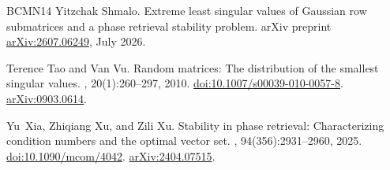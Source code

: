 \documentclass[11pt]{article}
\newcommand{\1}{\mathbf 1}
\begin{document}
\begin{thebibliography}{BCMN14}
Yitzchak Shmalo.
\newblock Extreme least singular values of {Gaussian} row submatrices and a
  phase retrieval stability problem.
\newblock arXiv preprint \href{https://arxiv.org/abs/2607.06249}{arXiv:2607.06249}, July 2026.

Terence Tao and Van Vu.
\newblock Random matrices: The distribution of the smallest singular values.
, 20(1):260--297, 2010.
\newblock
  \href{https://doi.org/10.1007/s00039-010-0057-8}{doi:10.1007/s00039-010-0057-8}.
  \href{https://arxiv.org/abs/0903.0614}{arXiv:0903.0614}.

Yu~Xia, Zhiqiang Xu, and Zili Xu.
\newblock Stability in phase retrieval: Characterizing condition numbers and
  the optimal vector set.
, 94(356):2931--2960, 2025.
\newblock \href{https://doi.org/10.1090/mcom/4042}{doi:10.1090/mcom/4042}.
  \href{https://arxiv.org/abs/2404.07515}{arXiv:2404.07515}.

\end{thebibliography}
\end{document}
